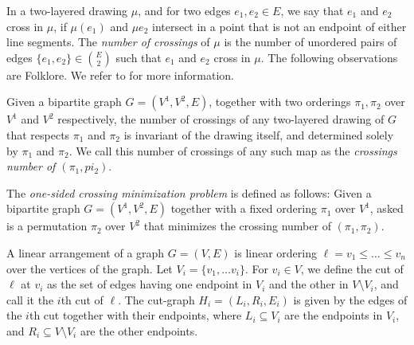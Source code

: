 \documentclass[a4paper,UKenglish,cleveref, autoref, thm-restate]{lipics-v2021}
\begin{document}
In a two-layered drawing $\mu$, and for two edges $e_1, e_2 \in E$, we say that $e_1$ and $e_2$ cross in $\mu$, if $\mu(e_1)$ and $\mu{e_2}$ intersect in a point that is not an endpoint of either line segments. The \emph{number of crossings} of $\mu$ is the number of unordered pairs of edges $\{e_1, e_2\}\in \binom{E}{2}$ such that $e_1$ and $e_2$ cross in $\mu$.
The following observations are Folklore. We refer to \cite{DBLP:journals/algorithmica/DujmovicW04} for more information.
\begin{lemma}
    Given a bipartite graph $G=(V^1,V^2, E)$, together with two orderings $\pi_1, \pi_2$ over $V^1$ and $V^2$ respectively, the number of crossings of any two-layered drawing  of $G$ that respects $\pi_1$ and $\pi_2$ is invariant of the drawing itself, and determined solely by $\pi_1$ and $\pi_2$.
    We call this number of crossings of any such map as the \emph{crossings number of $(\pi_1, pi_2)$}.
\end{lemma}

\begin{definition}
    The \emph{one-sided crossing minimization problem} is defined as follows: Given a bipartite graph $G = (V^1,V^2,E)$ together with a fixed ordering $\pi_1$ over $V^1$, asked is a permutation $\pi_2$ over $V^2$ that minimizes the crossing number of $(\pi_1, \pi_2)$.
\end{definition}

A linear arrangement of a graph $G=(V,E)$ is linear ordering $\ell = v_1\leq \dots \leq v_n$ over the vertices of the graph. Let $V_i = \{v_1,\dots v_i\}$. For $v_i \in V$, we define the cut of $\ell$ at $v_i$ as the set of edges having one endpoint in $V_i$ and the other in $V\setminus V_i$, and call it the $i$th cut of $\ell$. The cut-graph $H_i = (L_i,R_i, E_i)$ is given by the edges of the $i$th cut together with their endpoints, where $L_i\subseteq V_i$ are the endpoints in $V_i$, and $R_i \subseteq V\setminus V_i$ are the other endpoints.
\end{document}
